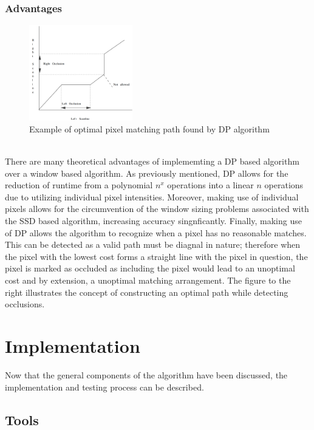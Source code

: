 \documentclass[11pt]{scrartcl}
\begin{document}
\subsubsection{Advantages}

\begin{figure}
  \includegraphics[width=0.4\textwidth]{dpG.png}
    \caption{\label{fig:frog1} Example of optimal pixel matching path found by DP algorithm}
\end{figure}
\\ 
There are many theoretical advantages of implememting
a DP based algorithm over a window based algorithm. 
As previously mentioned, DP allows for the reduction 
of runtime from a polynomial $n^x$ operations into 
a linear $n$ operations due to utilizing individual 
pixel intensities. Moreover, making use of individual pixels 
allows for the circumvention of the window sizing problems 
associated with the SSD based algorithm, increasing accuracy 
singnficantly. Finally, making use of DP allows the algorithm 
to recognize when a pixel has no reasonable matches. This can be detected 
as a valid path must be diagnal in nature; therefore when the pixel with the 
lowest cost forms a straight line with the pixel in question, the pixel is marked 
as occluded as including the pixel would lead to an unoptimal cost and by extension, 
a unoptimal matching arrangement. The figure to the right illustrates the concept 
of constructing an optimal path while detecting occlusions. 



\section{Implementation}
Now that the general components of the algorithm have been discussed, the implementation 
and testing process can be described. 

\subsection{Tools}
\end{document}
